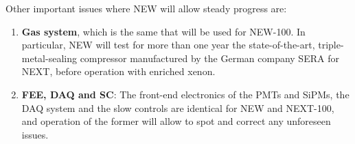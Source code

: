 Other important issues where NEW will allow steady progress are:

 \begin{enumerate}
\item {\bf Gas system}, which is the same that will be used for NEW-100. In particular, NEW will test for more than one year the state-of-the-art, triple-metal-sealing compressor manufactured by the German company SERA for NEXT, before operation with enriched xenon. 
\item {\bf FEE, DAQ and SC}: The front-end electronics of the PMTs and SiPMs, the DAQ system and the slow controls are identical for NEW and NEXT-100, and operation of the former will allow to spot and correct any unforeseen issues. 
 \end{enumerate}
 
